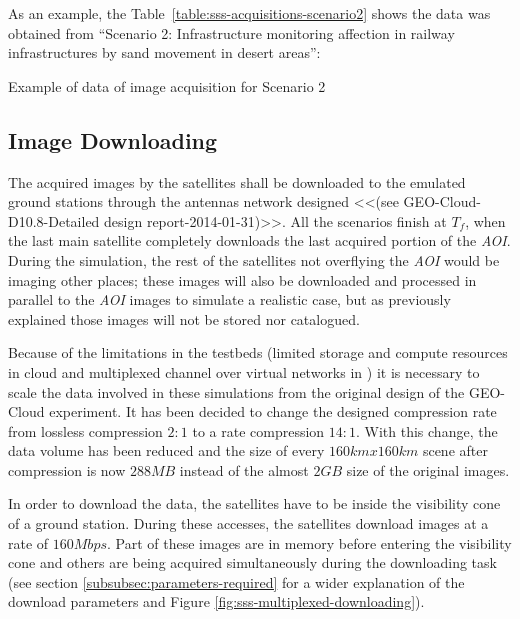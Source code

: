 As an example, the Table~\ref{table:sss-acquisitions-scenario2} shows the data was obtained from ``Scenario 2: Infrastructure monitoring affection in railway infrastructures by sand movement in desert areas'':

\begin{table}[hp]
  \centering
  {\small
  
  }
  \caption{Example of data of image acquisition for Scenario 2}
  \label{table:sss-acquisitions-scenario2}
\end{table}


\subsection{Image Downloading}
\label{subsec:image-downloading}

The acquired images by the satellites shall be downloaded to the emulated ground
stations through the antennas network designed <<(see GEO-Cloud-D10.8-Detailed
design report-2014-01-31)>>. All the scenarios finish at $T_f$, when the last
main satellite completely downloads the last acquired portion of the
\emph{AOI}. During the simulation, the rest of the satellites not overflying the
\emph{AOI} would be imaging other places; these images will also be downloaded
and processed in parallel to the \emph{AOI} images to simulate a realistic case,
but as previously explained those images will not be stored nor catalogued.

Because of the limitations in the testbeds (limited storage and compute
resources in \bonfire cloud and multiplexed channel over virtual networks in
\vw) it is necessary to scale the data involved in these simulations from the
original design of the GEO-Cloud experiment. It has been decided to change the
designed compression rate from lossless compression $2:1$ to a rate compression
$14:1$. With this change, the data volume has been reduced and the size of every
$160km x 160km$ scene after compression is now $288MB$ instead of the almost
$2GB$ size of the original images.

In order to download the data, the satellites have to be inside the visibility
cone of a ground station. During these accesses, the satellites download images
at a rate of $160Mbps$. Part of these images are in memory before entering the
visibility cone and others are being acquired simultaneously during the
downloading task (see section \ref{subsubsec:parameters-required} for a wider explanation of the download parameters and Figure \ref{fig:sss-multiplexed-downloading}).

